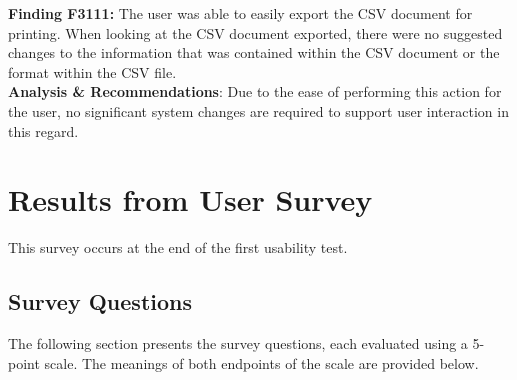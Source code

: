 \documentclass{article}
\begin{document}
\noindent \hypertarget{finding:F3111}{\textbf{Finding F3111:}} 
The user was able to easily export the CSV document for printing. When looking at the CSV document exported, there were no suggested changes to the information that was contained within the CSV document or the format within the CSV file.\\ 

\noindent \textbf{Analysis \& Recommendations}:
Due to the ease of performing this action for the user, no significant system changes are required to support user interaction in this regard.

\section{Results from User Survey}

This survey occurs at the end of the first usability test. 


\subsection{Survey Questions}

The following section presents the survey questions, each evaluated using a 5-point scale. The meanings of both endpoints of the scale are provided below.
\end{document}
